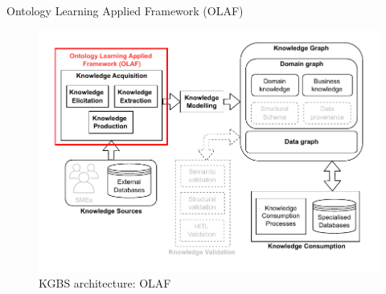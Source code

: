 


\begin{frame}{Ontology Learning Applied Framework (OLAF)}

    \begin{figure} [H]
        \begin{center}
            \includegraphics[scale=0.5]{images/KGBS-knowledge-acquisition-OLAF.pdf} 
            \caption{KGBS architecture: OLAF} 
        \end{center}
    \end{figure}

\end{frame}

